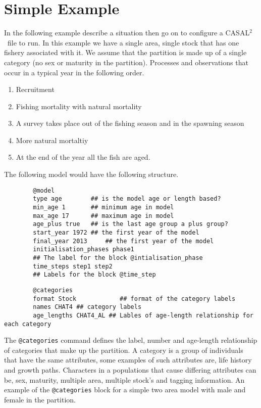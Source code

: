 \documentclass[12pt]{article}
\makeatletter
\newcommand{\CAS}{CASAL$^2$}
\newcommand{\command}[1] {\texttt{@#1}}
\makeatother
\begin{document}
\section{Simple Example}\label{Sec:simp}
In the following example describe a situation then go on to configure a \CAS\ file to run. In this example we have a single area, single stock that has one fishery associated with it. We assume that the partition is made up of a single category (no sex or maturity in the partition). Processes and observations that occur in a typical year in the following order. \\
\begin{enumerate}
	\item Recruitment
	\item Fishing mortality with natural mortality
	\item A survey takes place out of the fishing season and in the spawning season
	\item More natural mortaltiy
	\item At the end of the year all the fish are aged.
\end{enumerate}

The following model would have the following structure.

{\small{\begin{verbatim}
		@model
		type age		## is the model age or length based?
		min_age 1		## minimum age in model
		max_age 17		## maximum age in model
		age_plus true	## is the last age group a plus group?
		start_year 1972	## the first year of the model
		final_year 2013 	## the first year of the model
		initialisation_phases phase1	
		## The label for the block @intialisation_phase
		time_steps step1 step2
		## Labels for the block @time_step
		\end{verbatim}}}



{\small{\begin{verbatim}
		@categories
		format Stock			## format of the category labels
		names CHAT4 ## category labels
		age_lengths CHAT4_AL ## Lables of age-length relationship for each category
		\end{verbatim}}}


The \command{categories} command defines the label, number and age-length relationship of categories that make up the partition. A category is a group of individuals that have the same attributes, some examples of such attributes are, life history and growth paths. Characters in a populations that cause differing attributes can be, sex, maturity, multiple area, multiple stock's and tagging information. An example of the \command{categories} block for a simple two area model with male and female in the partition.
\end{document}
